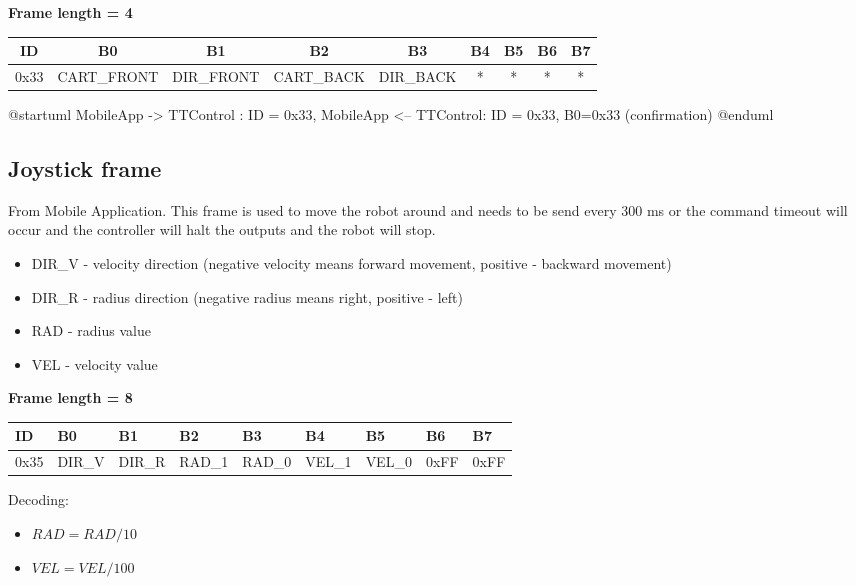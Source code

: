 \documentclass{article}
\begin{document}
\textbf{Frame length = 4}
\begin{center}
    \begin{tabular}{|c| c | c | c | c | c | c | c | c |}
        \hline
        ID   & B0          & B1         & B2         & B3        & B4 & B5 & B6 & B7 \\
        \hline
        0x33 & CART\_FRONT & DIR\_FRONT & CART\_BACK & DIR\_BACK & *  & *  & *  & *  \\
        \hline
    \end{tabular}
\end{center}

\begin{plantuml}
    @startuml
    MobileApp -> TTControl : ID = 0x33, 
    MobileApp <-- TTControl: ID = 0x33, B0=0x33 (confirmation)
    @enduml
\end{plantuml}

\subsection{Joystick frame}
From Mobile Application. This frame is used to move the robot around and needs to be send every 300 ms or the command timeout will occur and the controller will halt the outputs and the robot will stop.
\begin{itemize}
    \item DIR\_V - velocity direction (negative velocity means forward movement, positive - backward movement)
    \item DIR\_R - radius direction (negative radius means right, positive - left)
    \item RAD - radius value
    \item VEL - velocity value
\end{itemize}{}

\textbf{Frame length = 8 }
\begin{center}
    \begin{tabular}{| p{20pt} | p{40pt} | p{40pt} | p{40pt} | p{40pt} | p{40pt} | p{40pt} | p{40pt} | p{40pt} |}
        \hline
        ID   & B0     & B1     & B2     & B3     & B4     & B5     & B6   & B7   \\
        \hline
        0x35 & DIR\_V & DIR\_R & RAD\_1 & RAD\_0 & VEL\_1 & VEL\_0 & 0xFF & 0xFF \\
        \hline
    \end{tabular}
\end{center}

Decoding:
\begin{itemize}
    \item $RAD = RAD/10$
    \item $VEL = VEL/100$
\end{itemize}
\end{document}
